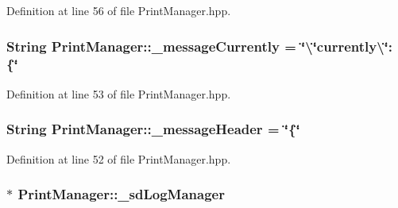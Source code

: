 Definition at line 56 of file Print\+Manager.\+hpp.

\subsubsection[{\texorpdfstring{\+\_\+message\+Currently}{_messageCurrently}}]{\setlength{\rightskip}{0pt plus 5cm}String Print\+Manager\+::\+\_\+message\+Currently = \char`\"{}\textbackslash{}\char`\"{}currently\textbackslash{}\char`\"{}\+: \{\char`\"{}\hspace{0.3cm}{\ttfamily [protected]}}\hypertarget{class_print_manager_a45a45bb347196bab8c3071cc5de6631a}{}\label{class_print_manager_a45a45bb347196bab8c3071cc5de6631a}


Definition at line 53 of file Print\+Manager.\+hpp.

\subsubsection[{\texorpdfstring{\+\_\+message\+Header}{_messageHeader}}]{\setlength{\rightskip}{0pt plus 5cm}String Print\+Manager\+::\+\_\+message\+Header = \char`\"{}\{\char`\"{}\hspace{0.3cm}{\ttfamily [protected]}}\hypertarget{class_print_manager_a352c21440d4b8da910822603bbc6439d}{}\label{class_print_manager_a352c21440d4b8da910822603bbc6439d}


Definition at line 52 of file Print\+Manager.\+hpp.

\subsubsection[{\texorpdfstring{\+\_\+sd\+Log\+Manager}{_sdLogManager}}]{$\ast$ Print\+Manager\+::\+\_\+sd\+Log\+Manager\hspace{0.3cm}{\ttfamily [protected]}}\hypertarget{class_print_manager_a76f3172298d67da7428e55b2515aa030}{}\label{class_print_manager_a76f3172298d67da7428e55b2515aa030}


